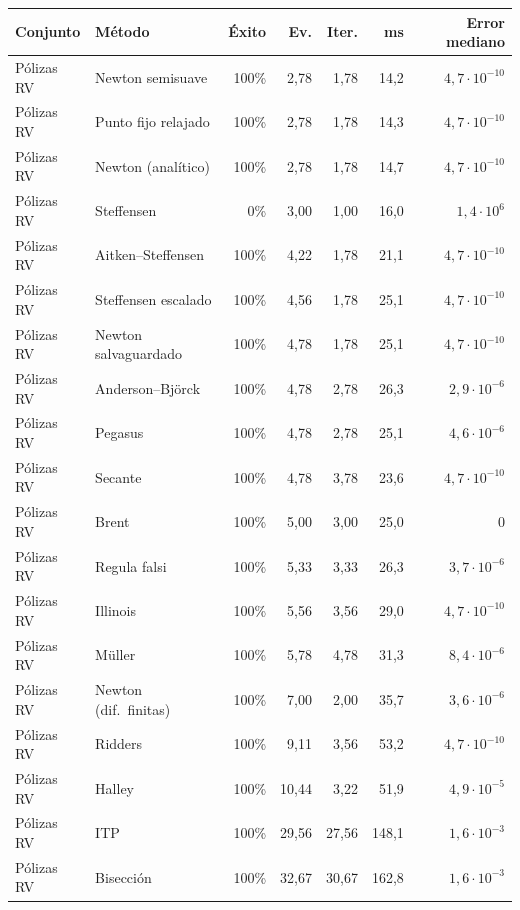 \begin{longtable}{@{}llrrrrr@{}}
\toprule
\textbf{Conjunto} & \textbf{Método} & \textbf{Éxito} & \textbf{Ev.} & \textbf{Iter.} & \textbf{ms} & \textbf{Error mediano} \\
\midrule
\endhead
Pólizas RV & Newton semisuave & 100\% & 2{,}78 & 1{,}78 & 14{,}2 & $4{,}7\cdot10^{-10}$ \\
Pólizas RV & Punto fijo relajado & 100\% & 2{,}78 & 1{,}78 & 14{,}3 & $4{,}7\cdot10^{-10}$ \\
Pólizas RV & Newton (analítico) & 100\% & 2{,}78 & 1{,}78 & 14{,}7 & $4{,}7\cdot10^{-10}$ \\
Pólizas RV & Steffensen & 0\% & 3{,}00 & 1{,}00 & 16{,}0 & $1{,}4\cdot10^{6}$ \\
Pólizas RV & Aitken--Steffensen & 100\% & 4{,}22 & 1{,}78 & 21{,}1 & $4{,}7\cdot10^{-10}$ \\
Pólizas RV & Steffensen escalado & 100\% & 4{,}56 & 1{,}78 & 25{,}1 & $4{,}7\cdot10^{-10}$ \\
Pólizas RV & Newton salvaguardado & 100\% & 4{,}78 & 1{,}78 & 25{,}1 & $4{,}7\cdot10^{-10}$ \\
Pólizas RV & Anderson--Björck & 100\% & 4{,}78 & 2{,}78 & 26{,}3 & $2{,}9\cdot10^{-6}$ \\
Pólizas RV & Pegasus & 100\% & 4{,}78 & 2{,}78 & 25{,}1 & $4{,}6\cdot10^{-6}$ \\
Pólizas RV & Secante & 100\% & 4{,}78 & 3{,}78 & 23{,}6 & $4{,}7\cdot10^{-10}$ \\
Pólizas RV & Brent & 100\% & 5{,}00 & 3{,}00 & 25{,}0 & $0$ \\
Pólizas RV & Regula falsi & 100\% & 5{,}33 & 3{,}33 & 26{,}3 & $3{,}7\cdot10^{-6}$ \\
Pólizas RV & Illinois & 100\% & 5{,}56 & 3{,}56 & 29{,}0 & $4{,}7\cdot10^{-10}$ \\
Pólizas RV & Müller & 100\% & 5{,}78 & 4{,}78 & 31{,}3 & $8{,}4\cdot10^{-6}$ \\
Pólizas RV & Newton (dif.\ finitas) & 100\% & 7{,}00 & 2{,}00 & 35{,}7 & $3{,}6\cdot10^{-6}$ \\
Pólizas RV & Ridders & 100\% & 9{,}11 & 3{,}56 & 53{,}2 & $4{,}7\cdot10^{-10}$ \\
Pólizas RV & Halley & 100\% & 10{,}44 & 3{,}22 & 51{,}9 & $4{,}9\cdot10^{-5}$ \\
Pólizas RV & ITP & 100\% & 29{,}56 & 27{,}56 & 148{,}1 & $1{,}6\cdot10^{-3}$ \\
Pólizas RV & Bisección & 100\% & 32{,}67 & 30{,}67 & 162{,}8 & $1{,}6\cdot10^{-3}$ \\

\end{longtable}

